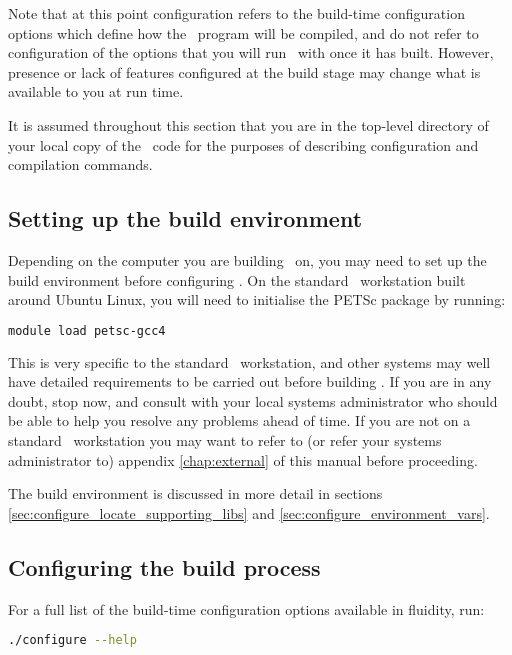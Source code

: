 Note that at this point configuration refers to the build-time configuration
options which define how the \fluidity\ program will be compiled, and do not
refer to configuration of the options that you will run \fluidity\ with once it 
has built. However, presence or lack of features configured at the build stage
may change what is available to you at run time.

It is assumed throughout this section that you are in the top-level directory
of your local copy of the \fluidity\ code for the purposes of describing
configuration and compilation commands.

\subsection{Setting up the build environment}

Depending on the computer you are building \fluidity\ on, you may need to set
up the build environment before configuring \fluidity. On the standard
\fluidity\ workstation built around Ubuntu Linux, you will need to initialise
the PETSc package by running:

\begin{lstlisting}[language=Bash]
module load petsc-gcc4
\end{lstlisting}

This is very specific to the standard \fluidity\ workstation, and other systems
may well have detailed requirements to be carried out before building
\fluidity. If you are in any doubt, stop now, and consult with your local
systems administrator who should be able to help you resolve any problems ahead
of time. If you are not on a standard \fluidity\ workstation you may want to
refer to (or refer your systems administrator to) appendix \ref{chap:external}
of this manual before proceeding.

The build environment is discussed in more detail in sections
\ref{sec:configure_locate_supporting_libs} and
\ref{sec:configure_environment_vars}.

\subsection{Configuring the build process}
\label{sec:configuring_the_build_process}

For a full list of the build-time configuration options available in fluidity,
run:

\begin{lstlisting}[language=Bash]
./configure --help
\end{lstlisting}

